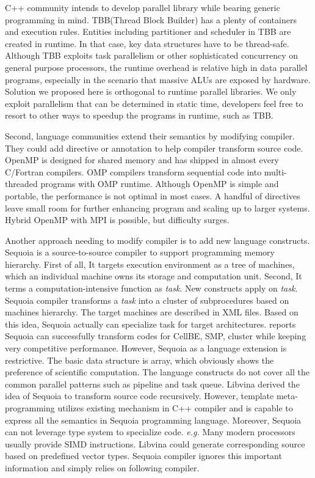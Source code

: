 \documentclass[10pt, conference, compsocconf]{IEEEtran}
\begin{document}
C++ community intends to develop parallel library while bearing generic programming in mind. TBB(Thread Block Builder) has a plenty of containers and execution rules. Entities including partitioner and scheduler in TBB are created in runtime. In that case, key data structures have to be thread-safe. Although TBB exploits task parallelism or other sophisticated concurrency on general purpose processors, the runtime overhead is relative high in data parallel programs, especially in the scenario that massive ALUs are exposed by hardware. Solution we proposed here is orthogonal to runtime parallel libraries. We only exploit parallelism that can be determined in static time, developers feel free to resort to other ways to speedup the programs in runtime, such as TBB.
 

Second, language communities extend their semantics by modifying compiler. They could add directive or annotation to help compiler transform source code. OpenMP is designed for shared memory and has shipped in almost every C/Fortran compilers. OMP compilers transform sequential code into multi-threaded programs with OMP runtime. Although OpenMP is simple and portable, the performance is not optimal in most cases. A handful of directives leave small room for further enhancing program and scaling up to larger systems. Hybrid OpenMP with MPI is possible, but difficulty surges.

Another approach needing to modify compiler is to add new language constructs. Sequoia is a source-to-source compiler to support programming memory hierarchy. First of all, It targets execution environment as a tree of machines, which an individual machine owns its storage and computation unit. Second, It terms a computation-intensive function as \textit{task}. New constructs apply on \emph{task}. Sequoia compiler transforms a \textit{task} into a cluster of subprocedures based on machines hierarchy. The target machines are described in XML files. Based on this idea, Sequoia actually can specialize task for target architectures. \cite{b2} reports Sequoia can successfully transform codes for CellBE, SMP, cluster while keeping very competitive performance. However, Sequoia as a language extension is restrictive. The basic data structure is array, which obviously shows the preference of scientific computation. The language constructs do not cover all the common parallel patterns such as pipeline and task queue. Libvina derived the idea of Sequoia to transform source code recursively. However, template meta-programming utilizes existing mechanism in C++ compiler and is capable to express all the semantics in Sequoia programming language. Moreover, Sequoia can not leverage type system to specialize code. \textit{e.g.} Many modern processors usually provide SIMD instructions. Libvina could generate corresponding source based on predefined vector types. Sequoia compiler ignores this important information and simply relies on following compiler.
\end{document}
